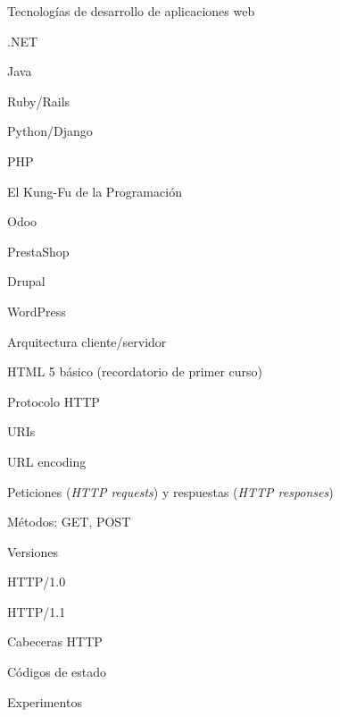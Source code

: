 \begin{longenum}
\begin{longenum}
\begin{longenum}
            \item Tecnologías de desarrollo de aplicaciones web
            \begin{longenum}
                \item .NET
                \item Java
                \item Ruby/Rails
                \item Python/Django
                \item PHP
                \item El Kung-Fu de la Programación
                \begin{longenum}
                    \item Odoo
                    \item PrestaShop
                    \item Drupal
                    \item WordPress
                \end{longenum}
            \end{longenum}
        \end{longenum}
        \item Arquitectura cliente/servidor
        \item HTML 5 básico (recordatorio de primer curso)
        \item Protocolo HTTP
        \begin{longenum}
            \item URIs
            \begin{longenum}
                \item URL encoding
            \end{longenum}
            \item Peticiones (\textit{HTTP requests}) y respuestas (\textit{HTTP responses})
            \item Métodos: GET, POST
            \item Versiones
            \begin{longenum}
                \item HTTP/1.0
                \item HTTP/1.1
            \end{longenum}
            \item Cabeceras HTTP
            \item Códigos de estado
            \item Experimentos
            \begin{longenum}

\end{longenum}
\end{longenum}
\end{longenum}
\end{longenum}
